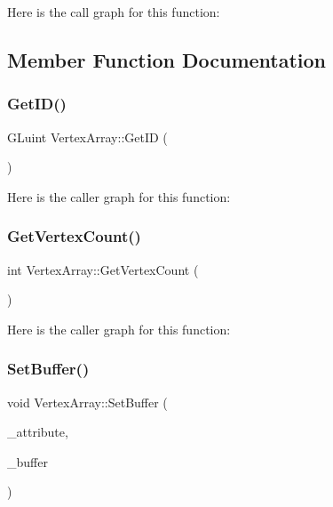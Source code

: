 Here is the call graph for this function\+:


\subsection{Member Function Documentation}
\mbox{\label{class_disc___engine_1_1_vertex_array_ab5d3887c2b7ab5fa779cda481f776c98}} 
\subsubsection{\texorpdfstring{Get\+I\+D()}{GetID()}}
{\footnotesize\ttfamily G\+Luint Vertex\+Array\+::\+Get\+ID (\begin{DoxyParamCaption}{ }\end{DoxyParamCaption})}

Here is the caller graph for this function\+:
\mbox{\label{class_disc___engine_1_1_vertex_array_a94f9ebffa24c5721783099fef186f9a0}} 
\subsubsection{\texorpdfstring{Get\+Vertex\+Count()}{GetVertexCount()}}
{\footnotesize\ttfamily int Vertex\+Array\+::\+Get\+Vertex\+Count (\begin{DoxyParamCaption}{ }\end{DoxyParamCaption})}

Here is the caller graph for this function\+:
\mbox{\label{class_disc___engine_1_1_vertex_array_a4e37246586ba4eca3a7734b050319a39}} 
\subsubsection{\texorpdfstring{Set\+Buffer()}{SetBuffer()}}
{\footnotesize\ttfamily void Vertex\+Array\+::\+Set\+Buffer (\begin{DoxyParamCaption}\item[{std\+::string}]{\+\_\+attribute,  }\item[{std\+::shared\+\_\+ptr$<$ \mbox{\hyperlink{class_disc___engine_1_1_vertex_buffer}{Vertex\+Buffer}} $>$}]{\+\_\+buffer }\end{DoxyParamCaption})}


